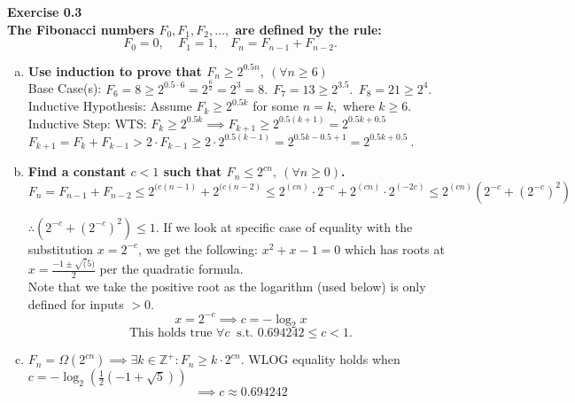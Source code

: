 \documentclass{article}
\newenvironment{problem}[2][Exercise]
    { \begin{mdframed}[backgroundcolor=gray!20] \textbf{#1 #2} \\}
    {  \end{mdframed}}
\renewcommand{\qed}{\quad\qedsymbol}
\begin{document}
\begin{problem}{0.3}
    \textbf{The Fibonacci numbers $F_0, F_1, F_2, \ldots,$ are defined by the rule:}
    \[
        F_0=0, \ \ \ \ \ 
        F_1=1, \ \ \ \ 
        F_n=F_{n-1}+F_{n-2}.
    \]

    \begin{enumerate}[(a)]
        \item \textbf{Use induction to prove that $F_n \geq 2^{0.5n}, \ (\forall n \geq 6)$}
        \\
        Base Case(s):
        $F_6 = 8 \geq 2^{0.5 \cdot 6} = 2^{\frac{6}{2}} = 2^3 = 8. \ \ F_7=13 \geq 2^{3.5}. \ \ F_8=21 \geq 2^4.$
        \\
        Inductive Hypothesis:
        Assume $F_k\geq2^{0.5k}$ for some $n=k,$ where $k\geq6$.
        \\
        Inductive Step:
        WTS: $F_k\geq2^{0.5k}
        \implies
        F_{k+1}\geq2^{0.5(k+1)}
        =2^{0.5k+0.5}$
        \\
        $F_{k+1}=F_{k}+F_{k-1}
        > 2\cdot F_{k-1}
        \geq 2\cdot 2^{0.5(k-1)}
        = 2^{0.5k-0.5+1} 
        = \boxed{2^{0.5k+0.5}} \ .$
        \qed
        
        \item \textbf{Find a constant $c < 1$ such that $F_n \leq 2^{cn}, \  (\forall n \geq 0)$.}
        \\
        $F_n = F_{n-1} + F_{n-2} 
        \leq 2^{(c(n-1)} + 2^{(c(n-2)} 
        \leq 2^{(cn)} \cdot 2^{-c} + 2^{(cn)} \cdot 2^{(-2c)} 
        \leq 2^{(cn)} (2^{-c} + (2^{-c})^2)$
        
        $\therefore (2^{-c} + (2^{-c})^2) \leq 1$. If we look at specific case of equality with the substitution $x=2^{-c}$, we get the following: $x^2 + x - 1 = 0$
        which has roots at $x = \frac{-1 \pm \sqrt(5)}{2}$ per the quadratic formula.
        \\
        Note that we take the positive root as the logarithm (used below) is only defined for inputs $>0$.
        \[
            x=2^{-c}
            \implies
            c = -\log_2 x
        \]
        \[
            \boxed{\text{This holds true }\forall c \ \text{ s.t. } 0.694242 \leq c < 1}.
        \]
        
        \item $F_n=\Omega(2^{cn})\implies\exists k\in\mathbb Z^+: F_n \geq k\cdot 2^{cn}$.
        WLOG equality holds when $c=-\log_2(\frac12 (-1 + \sqrt{5}))$
        \[
            \implies
            \boxed{c \approx 0.694242}
        \]
    \end{enumerate}
\end{problem}
\end{document}
